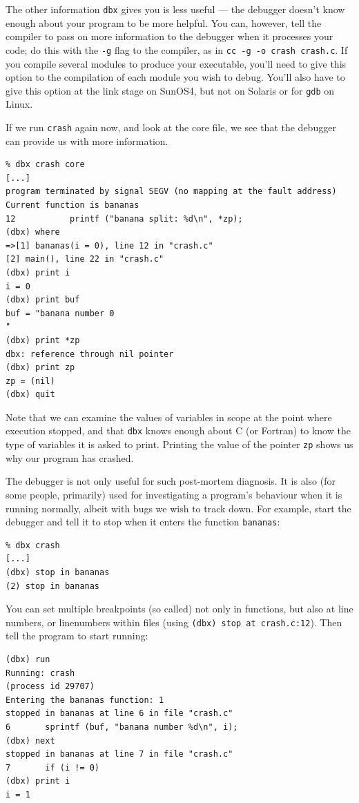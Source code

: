 \documentclass[11pt,oneside,chapters]{starlink}
\begin{document}
The other information \texttt{dbx} gives you is less
useful --- the debugger doesn't know enough about your
program to be more helpful.  You can, however, tell the
compiler to pass on more information to the debugger when
it processes your code; do this with the \texttt{-g}
flag to the compiler, as in \texttt{cc -g -o crash crash.c}.
If you compile several modules to produce
your executable, you'll need to give this option to the
compilation of each module you wish to debug.  You'll also
have to give this option at the link stage on SunOS4, but
not on Solaris or for \texttt{gdb} on Linux.

If we run \texttt{crash} again now, and look at the core file, we see
that the debugger can provide us with more information.

\begin{verbatim}
% dbx crash core
[...]
program terminated by signal SEGV (no mapping at the fault address)
Current function is bananas
12           printf ("banana split: %d\n", *zp);
(dbx) where
=>[1] bananas(i = 0), line 12 in "crash.c"
[2] main(), line 22 in "crash.c"
(dbx) print i
i = 0
(dbx) print buf
buf = "banana number 0
"
(dbx) print *zp
dbx: reference through nil pointer
(dbx) print zp
zp = (nil)
(dbx) quit
\end{verbatim}

Note that we can examine the values of variables in scope
at the point where execution stopped, and that
\texttt{dbx} knows enough about C (or Fortran) to know
the type of variables it is asked to print.  Printing the
value of the pointer \texttt{zp} shows us why our
program has crashed.

The debugger is not only useful for such post-mortem
diagnosis.  It is also (for some people, primarily) used
for investigating a program's behaviour when it is running
normally, albeit with bugs we wish to track down.  For
example, start the debugger and tell it to stop when it
enters the function \texttt{bananas}:

\begin{verbatim}
% dbx crash
[...]
(dbx) stop in bananas
(2) stop in bananas
\end{verbatim}

You can set multiple breakpoints (so called) not only in functions,
but also at line numbers, or linenumbers within files (using
\texttt{(dbx) stop at crash.c:12}).  Then tell the
program to start running:

\begin{verbatim}
(dbx) run
Running: crash
(process id 29707)
Entering the bananas function: 1
stopped in bananas at line 6 in file "crash.c"
6       sprintf (buf, "banana number %d\n", i);
(dbx) next
stopped in bananas at line 7 in file "crash.c"
7       if (i != 0)
(dbx) print i
i = 1
\end{verbatim}
\end{document}

